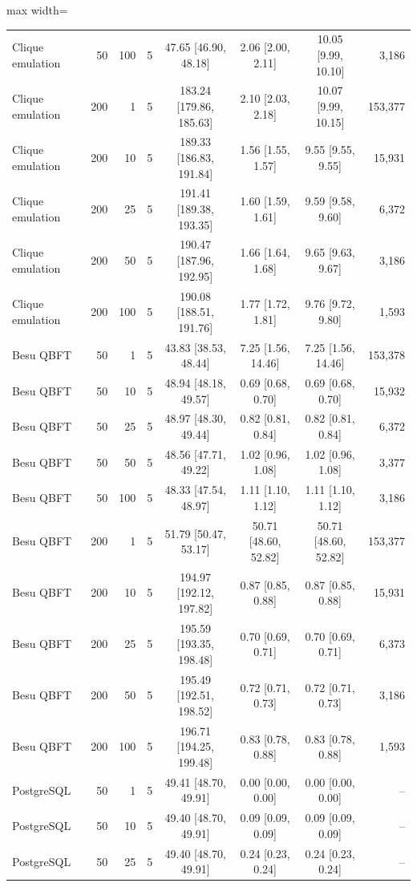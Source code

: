 \begin{table}[t]
\begin{adjustbox}{max width=\textwidth}
\begin{tabular}{lrrrcccr}
Clique emulation & 50 & 100 & 5 & 47.65 [46.90, 48.18] & 2.06 [2.00, 2.11] & 10.05 [9.99, 10.10] & 3,186 \\
Clique emulation & 200 & 1 & 5 & 183.24 [179.86, 185.63] & 2.10 [2.03, 2.18] & 10.07 [9.99, 10.15] & 153,377 \\
Clique emulation & 200 & 10 & 5 & 189.33 [186.83, 191.84] & 1.56 [1.55, 1.57] & 9.55 [9.55, 9.55] & 15,931 \\
Clique emulation & 200 & 25 & 5 & 191.41 [189.38, 193.35] & 1.60 [1.59, 1.61] & 9.59 [9.58, 9.60] & 6,372 \\
Clique emulation & 200 & 50 & 5 & 190.47 [187.96, 192.95] & 1.66 [1.64, 1.68] & 9.65 [9.63, 9.67] & 3,186 \\
Clique emulation & 200 & 100 & 5 & 190.08 [188.51, 191.76] & 1.77 [1.72, 1.81] & 9.76 [9.72, 9.80] & 1,593 \\
Besu QBFT & 50 & 1 & 5 & 43.83 [38.53, 48.44] & 7.25 [1.56, 14.46] & 7.25 [1.56, 14.46] & 153,378 \\
Besu QBFT & 50 & 10 & 5 & 48.94 [48.18, 49.57] & 0.69 [0.68, 0.70] & 0.69 [0.68, 0.70] & 15,932 \\
Besu QBFT & 50 & 25 & 5 & 48.97 [48.30, 49.44] & 0.82 [0.81, 0.84] & 0.82 [0.81, 0.84] & 6,372 \\
Besu QBFT & 50 & 50 & 5 & 48.56 [47.71, 49.22] & 1.02 [0.96, 1.08] & 1.02 [0.96, 1.08] & 3,377 \\
Besu QBFT & 50 & 100 & 5 & 48.33 [47.54, 48.97] & 1.11 [1.10, 1.12] & 1.11 [1.10, 1.12] & 3,186 \\
Besu QBFT & 200 & 1 & 5 & 51.79 [50.47, 53.17] & 50.71 [48.60, 52.82] & 50.71 [48.60, 52.82] & 153,377 \\
Besu QBFT & 200 & 10 & 5 & 194.97 [192.12, 197.82] & 0.87 [0.85, 0.88] & 0.87 [0.85, 0.88] & 15,931 \\
Besu QBFT & 200 & 25 & 5 & 195.59 [193.35, 198.48] & 0.70 [0.69, 0.71] & 0.70 [0.69, 0.71] & 6,373 \\
Besu QBFT & 200 & 50 & 5 & 195.49 [192.51, 198.52] & 0.72 [0.71, 0.73] & 0.72 [0.71, 0.73] & 3,186 \\
Besu QBFT & 200 & 100 & 5 & 196.71 [194.25, 199.48] & 0.83 [0.78, 0.88] & 0.83 [0.78, 0.88] & 1,593 \\
PostgreSQL & 50 & 1 & 5 & 49.41 [48.70, 49.91] & 0.00 [0.00, 0.00] & 0.00 [0.00, 0.00] & -- \\
PostgreSQL & 50 & 10 & 5 & 49.40 [48.70, 49.91] & 0.09 [0.09, 0.09] & 0.09 [0.09, 0.09] & -- \\
PostgreSQL & 50 & 25 & 5 & 49.40 [48.70, 49.91] & 0.24 [0.23, 0.24] & 0.24 [0.23, 0.24] & -- \\

\end{tabular}
\end{adjustbox}
\end{table}
